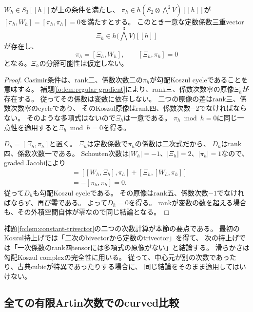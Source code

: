 \begin{lemma}[定数三重vectorによる二次Poissonの消去]
\label{fo:lem:constant-trivector}
$W_h\in S_3[[h]]$が上の条件を満たし、
$\pi_h\in h(S_2\otimes\bigwedge^2V)[[h]]$が
$[\pi_h,W_h]=[\pi_h,\pi_h]=0$を満たすとする。
このとき一意な定数係数三重vector
\[
 \Xi_h\in h\bigl(\textstyle\bigwedge^3V\bigr)[[h]]
\]
が存在し、
\begin{equation}\label{fo:eq:constant-trivector}
 \pi_h=[\Xi_h,W_h],\qquad [\Xi_h,\pi_h]=0
\end{equation}
となる。$\Xi_h$の分解可能性は仮定しない。
\end{lemma}
\begin{proof}
Casimir条件は、rank二、係数次数二の$\pi_h$が勾配Koszul cycleであることを意味する。
補題\ref{fo:lem:regular-gradient}により、rank三、係数次数零の原像$\Xi_h$が存在する。
従ってその係数は変数に依存しない。
二つの原像の差はrank三、係数次数零のcycleであり、
そのKoszul原像はrank四、係数次数$-2$でなければならない。
そのような多項式はないので$\Xi_h$は一意である。
$\pi_h\bmod h=0$に同じ一意性を適用すると$\Xi_h\bmod h=0$を得る。

$D_h=[\Xi_h,\pi_h]$と置く。
$\Xi_h$は定数係数で$\pi_h$の係数は二次式だから、
$D_h$はrank四、係数次数一である。
Schouten次数は$|W_h|=-1$、$|\Xi_h|=2$、$|\pi_h|=1$なので、graded Jacobiにより
\begin{align*}
 [W_h,D_h]
 &=[[W_h,\Xi_h],\pi_h]+[\Xi_h,[W_h,\pi_h]]\\
 &=-[\pi_h,\pi_h]=0.
\end{align*}
従って$D_h$も勾配Koszul cycleである。
その原像はrank五、係数次数$-1$でなければならず、再び零である。
よって$D_h=0$を得る。
rankが変数の数を超える場合も、その外積空間自体が零なので同じ結論となる。
\end{proof}

\begin{remark}[三次という次数を使う箇所]
補題\ref{fo:lem:constant-trivector}の二つの次数計算が本節の要点である。
最初のKoszul持上げでは「二次のbivectorから定数のtrivector」を得て、
次の持上げでは「一次係数のrank四tensorには多項式の原像がない」と結論する。
滑らかさは勾配Koszul complexの完全性に用いる。
従って、中心元が別の次数であったり、古典cubicが特異であったりする場合に、
同じ結論をそのまま適用してはいけない。
\end{remark}

\subsection{全ての有限Artin次数でのcurved比較}

